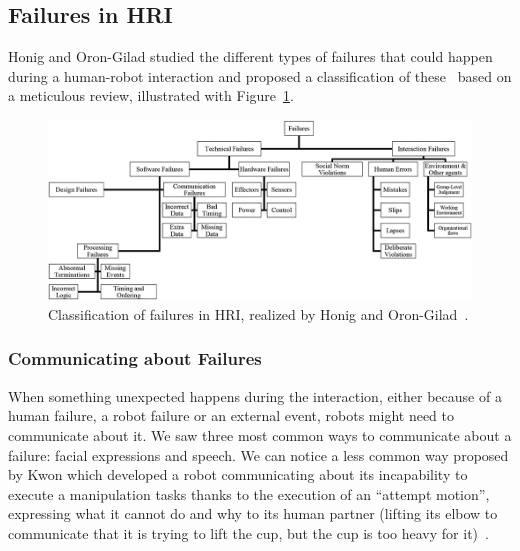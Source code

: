 \documentclass[a4paper,11pt,twoside]{StyleThese}
\begin{document}
\subsection{Failures in HRI}
Honig and Oron-Gilad studied the different types of failures that could happen during a human-robot interaction and proposed a classification of these~\cite{honig_2018_understanding} based on a meticulous review, illustrated with Figure~\ref{chap1:fig:err_hri}.

\begin{figure}[!ht]
	\includegraphics[width=\linewidth]{figures/chapter1/failures_hri.jpg}
	\caption{Classification of failures in HRI, realized by Honig and Oron-Gilad~\cite{honig_2018_understanding}.}
	\label{chap1:fig:err_hri}
\end{figure}

\subsubsection{Communicating about Failures}
When something unexpected happens during the interaction, either because of a human failure, a robot failure or an external event, robots might need to communicate about it. We saw three most common ways to communicate about a failure: facial expressions and speech. We can notice a less common way proposed by Kwon \etal{} which developed a robot communicating about its incapability to execute a manipulation tasks thanks to the execution of an ``attempt motion'', expressing what it cannot do and why to its human partner (\eg lifting its elbow to communicate that it is trying to lift the cup, but the cup is too heavy for it)~\cite{kwon_2018_expressing}. 
\end{document}

